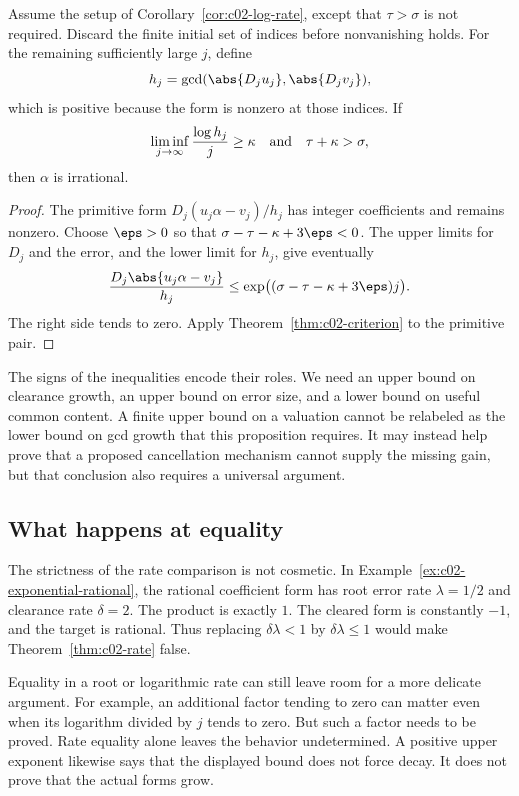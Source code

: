 \begin{proposition}
\label{prop:c02-content-rate}
Assume the setup of Corollary~\ref{cor:c02-log-rate}, except that $\tau>\sigma$ is not required. Discard the finite initial set of indices before nonvanishing holds. For the remaining sufficiently large $j$, define
\[
h_j=\gcd(\abs{D_ju_j},\abs{D_jv_j}),
\]
which is positive because the form is nonzero at those indices. If
\begin{equation}
\liminf_{j\to\infty}\frac{\log h_j}{j}\geq\kappa
\quad\hbox{and}\quad \tau+\kappa>\sigma,
\label{eq:c02-content-rate}
\end{equation}
then $\alpha$ is irrational.
\end{proposition}

\begin{proof}
The primitive form $D_j(u_j\alpha-v_j)/h_j$ has integer coefficients and remains nonzero. Choose $\eps>0$ so that $\sigma-\tau-\kappa+3\eps<0$. The upper limits for $D_j$ and the error, and the lower limit for $h_j$, give eventually
\[
\frac{D_j\abs{u_j\alpha-v_j}}{h_j}
\leq\exp\bigl((\sigma-\tau-\kappa+3\eps)j\bigr).
\]
The right side tends to zero. Apply Theorem~\ref{thm:c02-criterion} to the primitive pair.
\end{proof}

The signs of the inequalities encode their roles. We need an upper bound on clearance growth, an upper bound on error size, and a lower bound on useful common content. A finite upper bound on a valuation cannot be relabeled as the lower bound on gcd growth that this proposition requires. It may instead help prove that a proposed cancellation mechanism cannot supply the missing gain, but that conclusion also requires a universal argument.

\subsection{What happens at equality}

The strictness of the rate comparison is not cosmetic. In Example~\ref{ex:c02-exponential-rational}, the rational coefficient form has root error rate $\lambda=1/2$ and clearance rate $\delta=2$. The product is exactly $1$. The cleared form is constantly $-1$, and the target is rational. Thus replacing $\delta\lambda<1$ by $\delta\lambda\leq1$ would make Theorem~\ref{thm:c02-rate} false.

Equality in a root or logarithmic rate can still leave room for a more delicate argument. For example, an additional factor tending to zero can matter even when its logarithm divided by $j$ tends to zero. But such a factor needs to be proved. Rate equality alone leaves the behavior undetermined. A positive upper exponent likewise says that the displayed bound does not force decay. It does not prove that the actual forms grow.

